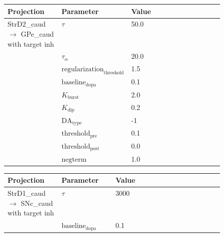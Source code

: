\documentclass{article}
\begin{document}
\noindent
\begin{tabularx}{\linewidth}{|p{0.25\linewidth}|p{0.25\linewidth}|X|}\hline
\textbf{Projection} & \textbf{Parameter} & \textbf{Value}   \\ \hline

    StrD2\_caud  $\rightarrow$ GPe\_caud with target inh & $\tau$        & 50.0  \\ \hline

     & $\tau_\alpha$        & 20.0  \\ \hline

     & ${\text{regularization}}_{\text{threshold}}$        & 1.5  \\ \hline

     & ${\text{baseline}}_{\text{dopa}}$        & 0.1  \\ \hline

     & $K_{\text{burst}}$        & 2.0  \\ \hline

     & $K_{\text{dip}}$        & 0.2  \\ \hline

     & ${\text{DA}}_{\text{type}}$        & -1  \\ \hline

     & ${\text{threshold}}_{\text{pre}}$        & 0.1  \\ \hline

     & ${\text{threshold}}_{\text{post}}$        & 0.0  \\ \hline

     & ${\text{negterm}}$        & 1.0  \\ \hline

\end{tabularx}

\vspace{2ex}

\noindent
\begin{tabularx}{\linewidth}{|p{0.25\linewidth}|p{0.25\linewidth}|X|}\hline
\textbf{Projection} & \textbf{Parameter} & \textbf{Value}   \\ \hline

    StrD1\_caud  $\rightarrow$ SNc\_caud with target inh & $\tau$        & 3000  \\ \hline

     & ${\text{baseline}}_{\text{dopa}}$        & 0.1  \\ \hline

\end{tabularx}

\vspace{2ex}
\end{document}
